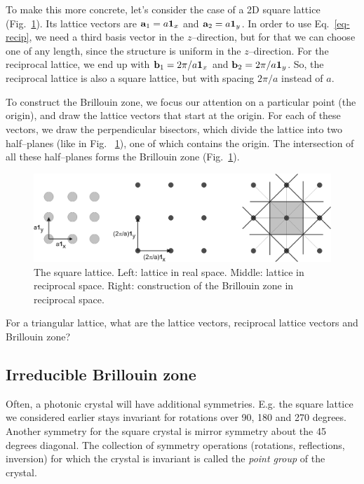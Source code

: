 To make this more concrete, let's consider the case of a 2D square lattice (Fig.~\ref{fig-bril-square}). Its lattice vectors are ${\bf a}_1 = a {\bf 1}_x$ and ${\bf a}_2 = a {\bf 1}_y$. In order to use Eq.~\ref{eq-recip}, we need a third basis vector in the $z$--direction, but for that we can choose one of any length, since the structure is uniform in the $z$--direction. For the reciprocal lattice, we end up with  ${\bf b}_1 = 2 \pi / a {\bf 1}_x$ and ${\bf b}_2 = 2 \pi / a {\bf 1}_y$. So, the reciprocal lattice is also a square lattice, but with spacing $2 \pi / a$ instead of $a$.

To construct the Brillouin zone, we focus our attention on a particular point (the origin), and draw the lattice vectors that start at the origin. For each of these vectors, we draw the perpendicular bisectors, which divide the lattice into two half--planes (like in Fig.~ \ref{fig-bril-square}), one of which contains the origin. The intersection of all these half--planes forms the Brillouin zone (Fig.~\ref{fig-bril-square}).

\begin{figure}
\centering
\includegraphics[width=12cm]{periodic/figures/brillouin_square}
\caption{The square lattice. Left: lattice in real space. Middle: lattice in reciprocal space. Right: construction of the Brillouin zone in reciprocal space.}
\label{fig-bril-square}
\end{figure}

\begin{sidebar}
\begin{ex}
For a triangular lattice, what are the lattice vectors, reciprocal lattice vectors and Brillouin zone?
\end{ex}
\end{sidebar}
 
\subsection{Irreducible Brillouin zone}

Often, a photonic crystal will have additional symmetries. E.g. the square lattice we considered earlier stays invariant for rotations over 90, 180 and 270 degrees. Another symmetry for the square crystal is mirror symmetry about the 45 degrees diagonal. The collection of symmetry operations (rotations, reflections, inversion) for which the crystal is invariant is called the \emph{point group} of the crystal.


